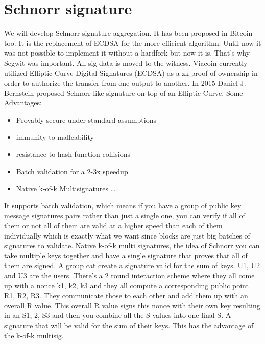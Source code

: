 \documentclass{article}
\begin{document}
\section{Schnorr signature}\label{sec: Schnorr signature}
We will develop Schnorr signature aggregation. It has been proposed in Bitcoin
too. It is the replacement of ECDSA for the more efficient algorithm. Until now it
was not possible to implement it without a hardfork but now it is. That’s why
Segwit was important. All sig data is moved to the witness.
Viacoin currently utilized Elliptic Curve Digital Signatures (ECDSA) as a zk proof of
ownership in order to authorize the transfer from one output to another. In 2015
Daniel J. Bernstein proposed Schnorr like signature on top of an Elliptic Curve.
\newline \newline
Some Advantages:
\begin{itemize}
\item Provably secure under standard assumptions
\item immunity to malleability
\item resistance to hash-function collisions
\item Batch validation for a 2-3x speedup
\item Native k-of-k Multisignatures \ldots
\end{itemize}
\noindent
It supports batch validation, which means if you have a group of public key
message signatures pairs rather than just a single one, you can verify if all of
them or not all of them are valid at a higher speed than each of them individually
which is exactly what we want since blocks are just big batches of signatures to
validate.
\linebreak \noindent
Native k-of-k multi signatures, the idea of Schnorr you can take multiple keys
together and have a single signature that proves that all of them are signed.
A group cat create a signature valid for the sum of keys.
U1, U2 and U3 are the users. There’s a 2 round interaction scheme where they all
come up with a nonce k1, k2, k3 and they all compute a corresponding public
point R1, R2, R3. They communicate those to each other and add them up with
an overall R value. This overall R value signs this nonce with their own key
resulting in an S1, 2, S3 and then you combine all the S values into one final S. A
signature that will be valid for the sum of their keys. This has the advantage of
the k-of-k multisig.
\linebreak
\end{document}
